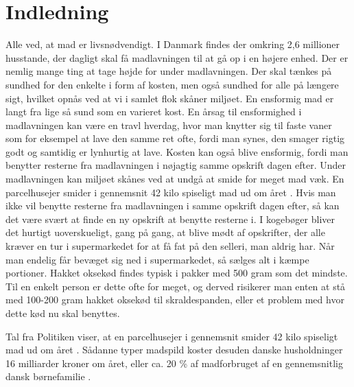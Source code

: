 \chapter{Indledning}
\label{chap:indledning}

Alle ved, at mad er livsnødvendigt. I Danmark findes der omkring 2,6 millioner husstande\cite{husstande}, der dagligt skal få madlavningen til at gå op i en højere enhed. Der er nemlig mange ting at tage højde for under madlavningen. Der skal tænkes på sundhed for den enkelte i form af kosten, men også sundhed for alle på længere sigt, hvilket opnås ved at vi i samlet flok skåner miljøet.
En ensformig mad er langt fra lige så sund som en varieret kost. En årsag til ensformighed i madlavningen kan være en travl hverdag, hvor man knytter sig til faste vaner som for eksempel at lave den samme ret ofte, fordi man synes, den smager rigtig godt og samtidig er lynhurtig at lave. Kosten kan også blive ensformig, fordi man benytter resterne fra madlavningen i nøjagtig samme opskrift dagen efter.
Under madlavningen kan miljøet skånes ved at undgå at smide for meget mad væk. En parcelhusejer smider i gennemsnit 42 kilo spiseligt mad ud om året \cite{madspildpol}. Hvis man ikke vil benytte resterne fra madlavningen i samme opskrift dagen efter, så kan det være svært at finde en ny opskrift at benytte resterne i. I kogebøger bliver det hurtigt uoverskueligt, gang på gang, at blive mødt af opskrifter, der alle kræver en tur i supermarkedet for at få fat på den selleri, man aldrig har. Når man endelig får bevæget sig ned i supermarkedet, så sælges alt i kæmpe portioner. Hakket oksekød findes typisk i pakker med 500 gram som det mindste. Til en enkelt person er dette ofte for meget, og derved risikerer man enten at stå med 100-200 gram hakket oksekød til skraldespanden, eller et problem med hvor dette kød nu skal benyttes.

Tal fra Politiken viser, at en parcelhusejer i gennemsnit smider 42 kilo spiseligt mad ud om året \cite{madspildpol}.
Sådanne typer madspild koster desuden danske husholdninger 16 milliarder kroner om året, eller ca. 20 \% af madforbruget af en gennemsnitlig dansk børnefamilie \cite{madspild16}. 
